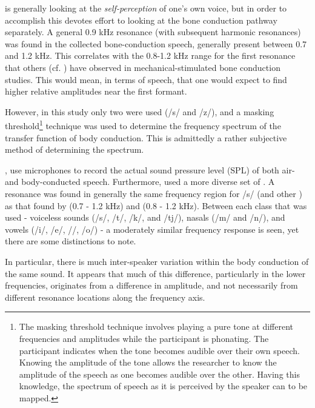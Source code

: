 \cite{porschmann:00} \DIFdelbegin {}\DIFdelend is generally looking at the \textit{self-perception} of one's own voice, but in order to accomplish this devotes effort to looking at the bone conduction pathway separately.  A general 0.9 kHz resonance (with subsequent harmonic resonances) was found in the collected bone-conduction speech, generally present between 0.7 and 1.2 kHz.  This correlates with the 0.8-1.2 kHz range for the first resonance that others (cf. \cite{hakansson:94}) have observed in mechanical-stimulated bone conduction studies. This would mean, in terms of speech, that one would expect to find higher relative amplitudes near the first formant.

However, in this study only two \DIFdelbegin {}\DIFdelend \DIFaddbegin {}\DIFaddend were used (/s/ and /z/), and a masking threshold\footnote{The masking threshold technique involves playing a pure tone at different frequencies and amplitudes while the participant is phonating. The participant indicates when the tone becomes audible over their own speech. Knowing the amplitude of the tone allows the researcher to know the amplitude of the speech as one becomes audible over the other. Having this knowledge, the spectrum of speech as it is perceived by the speaker can to be mapped.} technique was used to determine the frequency spectrum of the transfer function of body conduction.  This is admittedly a rather subjective method of determining the spectrum.  

\cite{reinfeldt:10}, use microphones to record the actual sound pressure level (SPL) of both air- and body-conducted speech. Furthermore, \cite{reinfeldt:10} used a more diverse set of \DIFdelbegin {}\DIFdelend \DIFaddbegin {}\DIFaddend .  A resonance was found in generally the same frequency region for /s/ (and other \DIFdelbegin {}\DIFdelend \DIFaddbegin {}\DIFaddend ) as that found by \cite{porschmann:00} (0.7 - 1.2 kHz) and \cite{hakansson:94} (0.8 - 1.2 kHz). %
Between each class that was used - voiceless sounds (/s/, /t/, /k/, and /tj/),  nasals (/m/ and /n/), and vowels (/i/, /e/, /\DIFdelbegin {}\DIFdelend \DIFaddbegin {}\DIFaddend /, /o/) - a moderately similar frequency response is seen, yet there are some distinctions to note. %

In particular, %
there is much inter-speaker variation within the body conduction of the same sound.  %
It appears that much of this difference, particularly in the lower frequencies, originates from a difference in amplitude, and not necessarily from different resonance locations along the frequency axis.  %

